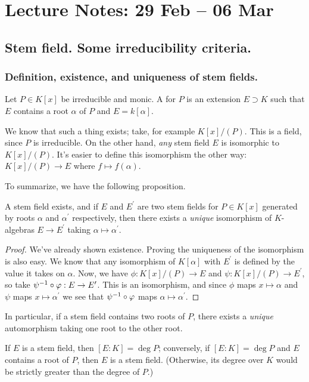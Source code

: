 \section[Stem field, splitting field, algebraic closure]{Lecture Notes: 29 Feb -- 06 Mar}

\subsection{Stem field. Some irreducibility criteria.}
\subsubsection{Definition, existence, and uniqueness of stem fields.}
\begin{dfn}
Let $P \in K[x]$ be irreducible and monic. A  for $P$ is an extension $E \supset K$ such that $E$ contains a root $\alpha$ of $P$ and $E = k[\alpha]$.
\end{dfn}

We know that such a thing exists; take, for example $K[x]/(P)$. This is a field, since $P$ is irreducible. On the other hand, \emph{any} stem field $E$ is isomorphic to $K[x]/(P)$. It's easier to define this isomorphism the other way: $K[x]/(P) \to E$ where $f \mapsto f(\alpha)$.

To summarize, we have the following proposition.

\begin{prop}
A stem field exists, and if $E$ and $E^\prime$ are two stem fields for $P \in K[x]$ generated by roots $\alpha$ and $\alpha^\prime$ respectively, then there exists a \emph{unique} isomorphism of $K$-algebras $E \to E^\prime$ taking $\alpha \mapsto \alpha^\prime$.
\end{prop}
\begin{proof}
We've already shown existence. Proving the uniqueness of the isomorphism is also easy. We know that any isomorphism of $K[\alpha]$ with $E^\prime$ is defined by the value it takes on $\alpha$. Now, we have $\phi: K[x]/(P) \to E$ and $\psi: K[x]/(P) \to E^\prime$, so take $\psi^{-1} \circ \varphi: E \to E^\prime$. This is an isomorphism, and since $\phi$ maps $x \mapsto \alpha$ and $\psi$ maps $x \mapsto \alpha^\prime$ we see that $\psi^{-1} \circ \varphi$ maps $\alpha \mapsto \alpha^\prime$.
\end{proof}

\begin{rmk}
In particular, if a stem field contains two roots of $P$, there exists a \emph{unique} automorphism taking one root to the other root.
\end{rmk}
\begin{rmk}
If $E$ is a stem field, then $[E:K] = \deg P$; conversely, if $[E:K] = \deg P$ and $E$ contains a root of $P$, then $E$ is a stem field. (Otherwise, its degree over $K$ would be strictly greater than the degree of $P$.)
\end{rmk}


